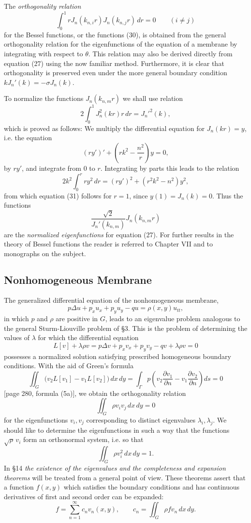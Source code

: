 The \emph{orthogonality relation}
\[
\int_0^1rJ_n(k_{n,i}r)J_n(k_{n,j}r)\,dr=0\qquad(i\ne j)
\]
for the Bessel functions, or the functions (30), is obtained from the general orthogonality relation for the eigenfunctions of the equation of a membrane by integrating with respect to $\theta$. This relation may also be derived directly from equation (27) using the now familiar method. Furthermore, it is clear that orthogonality is preserved even under the more general boundary condition $kJ_n'(k)=-\sigma J_n(k)$.

To normalize the functions $J_n(k_{n,m}r)$ we shall use relation
\begin{equation}\tag{31}
2\int_0^1J_n^2(kr)r\,dr=J_n'^2(k),
\end{equation}
which is proved as follows: We multiply the differential equation for $J_n(kr)=y$, i.e. the equation
\[
(ry')'+\left(rk^2-\frac{n^2}{r}\right)y=0,
\]
by $ry'$, and integrate from $0$ to $r$. Integrating by parts this leads to the relation
\[
2k^2\int_0^r ry^2\,dr=(ry')^2+(r^2k^2-n^2)y^2,
\]
from which equation (31) follows for $r=1$, since $y(1)=J_n(k)=0$. Thus the functions
\[
\frac{\sqrt2}{J_n'(k_{n,m})}J_n(k_{n,m}r)
\]
are the \emph{normalized eigenfunctions} for equation (27). For further results in the theory of Bessel functions the reader is referred to Chapter VII and to monographs on the subject.

\subsection{Nonhomogeneous Membrane}
The generalized differential equation of the nonhomogeneous membrane,
\[
p\Delta u+p_xu_x+p_yu_y-qu=\rho(x,y)u_{tt},
\]
in which $p$ and $\rho$ are positive in $G$, leads to an eigenvalue problem analogous to the general Sturm-Liouville problem of \S3. This is the problem of determining the values of $\lambda$ for which the differential equation
\[
L[v]+\lambda\rho v=p\Delta v+p_xv_x+p_yv_y-qv+\lambda\rho v=0
\]
possesses a normalized solution satisfying prescribed homogeneous boundary conditions. With the aid of Green's formula
\[
\iint_G\bigl(v_2L[v_1]-v_1L[v_2]\bigr)\,dx\,dy
=\int_\Gamma p\left(v_2\frac{\partial v_1}{\partial n}-v_1\frac{\partial v_2}{\partial n}\right)ds=0
\]
[page 280, formula (5a)], we obtain the orthogonality relation
\[
\iint_G\rho v_iv_j\,dx\,dy=0
\]
for the eigenfunctions $v_i,v_j$ corresponding to distinct eigenvalues $\lambda_i,\lambda_j$. We should like to determine the eigenfunctions in such a way that the functions $\sqrt\rho\,v_i$ form an orthonormal system, i.e. so that
\[
\iint_G\rho v_i^2\,dx\,dy=1.
\]
In \S14 \emph{the existence of the eigenvalues and the completeness and expansion theorems} will be treated from a general point of view. These theorems assert that a function $f(x,y)$ which satisfies the boundary conditions and has continuous derivatives of first and second order can be expanded:
\[
f=\sum_{n=1}^{\infty}c_nv_n(x,y),
\qquad
c_n=\iint_G\rho f v_n\,dx\,dy.
\]


